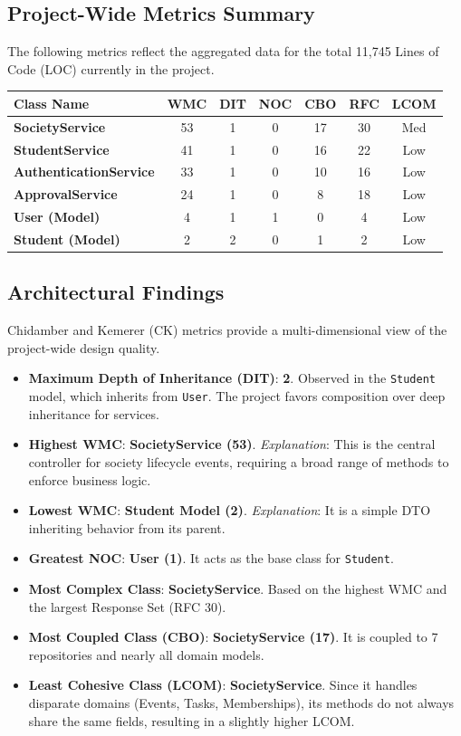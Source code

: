 \documentclass[12pt,a4paper]{article}
\begin{document}
\subsection{Project-Wide Metrics Summary}
The following metrics reflect the aggregated data for the total 11,745 Lines of Code (LOC) currently in the project. 

\begin{table}[H]
\centering
\begin{tabularx}{\textwidth}{X cccccc}
\toprule
\textbf{Class Name} & \textbf{WMC} & \textbf{DIT} & \textbf{NOC} & \textbf{CBO} & \textbf{RFC} & \textbf{LCOM} \\
\midrule
\textbf{SocietyService} & 53 & 1 & 0 & 17 & 30 & Med \\
\textbf{StudentService} & 41 & 1 & 0 & 16 & 22 & Low \\
\textbf{AuthenticationService} & 33 & 1 & 0 & 10 & 16 & Low \\
\textbf{ApprovalService} & 24 & 1 & 0 & 8 & 18 & Low \\
\textbf{User (Model)} & 4 & 1 & 1 & 0 & 4 & Low \\
\textbf{Student (Model)} & 2 & 2 & 0 & 1 & 2 & Low \\
\bottomrule
\end{tabularx}
\end{table}

\subsection{Architectural Findings}
Chidamber and Kemerer (CK) metrics provide a multi-dimensional view of the project-wide design quality.
\begin{itemize}
    \item \textbf{Maximum Depth of Inheritance (DIT)}: \textbf{2}. Observed in the \texttt{Student} model, which inherits from \texttt{User}. The project favors composition over deep inheritance for services.
    \item \textbf{Highest WMC}: \textbf{SocietyService (53)}. \textit{Explanation}: This is the central controller for society lifecycle events, requiring a broad range of methods to enforce business logic.
    \item \textbf{Lowest WMC}: \textbf{Student Model (2)}. \textit{Explanation}: It is a simple DTO inheriting behavior from its parent.
    \item \textbf{Greatest NOC}: \textbf{User (1)}. It acts as the base class for \texttt{Student}.
    \item \textbf{Most Complex Class}: \textbf{SocietyService}. Based on the highest WMC and the largest Response Set (RFC 30).
    \item \textbf{Most Coupled Class (CBO)}: \textbf{SocietyService (17)}. It is coupled to 7 repositories and nearly all domain models.
    \item \textbf{Least Cohesive Class (LCOM)}: \textbf{SocietyService}. Since it handles disparate domains (Events, Tasks, Memberships), its methods do not always share the same fields, resulting in a slightly higher LCOM.
\end{itemize}
\end{document}
